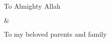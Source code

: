 \documentclass[main.tex]{subfiles}
\begin{document}
\centering

\vspace*{3cm}

{\LARGE{To Almighty Allah}}

\vspace*{1.0cm}

{\LARGE{$\&$}}\\

\vspace*{1.0cm}

{\LARGE{To my beloved parents and family}}\\

\vspace*{5cm}



\thispagestyle{fancy}
\newpage
\end{document}
